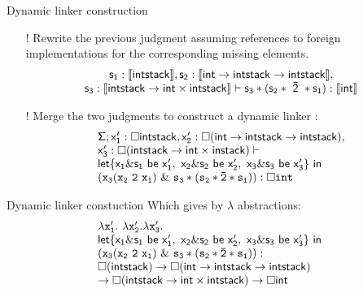 \documentclass{beamer}
\begin{document}
 \begin{frame} {Dynamic linker construction}
  \begin{itemize}
  \item[!] Rewrite the previous judgment assuming references to foreign implementations for 
  the corresponding missing elements.
\[\begin{array}{c} {\sf s_1:\llbracket intstack\rrbracket, s_2:\llbracket int\rightarrow intstack\rightarrow intstack\rrbracket},\\ {\sf s_3:\llbracket intstack\rightarrow int\times intstack \rrbracket \vdash s_3 * (s_2 * \ \bar{2}\ * s_1):\llbracket int\rrbracket} \end{array} \]
\item[!] Merge the two judgments to construct a dynamic linker :
\[\begin{array}{l} {\sf \Sigma}; {\sf {x_1^{\prime}:\Box intstack ,x_2^{\prime}:\Box(int\rightarrow intstack\rightarrow intstack)}},\\ {\sf x_3^{\prime}: \Box (intstack\rightarrow int\times instack)}\vdash \\ {\sf let\{ x_1\& s_1 {\ \sf be \ } x_1^{\prime}, \ x_2\& s_2 {\ \sf be \ } x_2^{\prime}, \ x_3\& s_3 {\ \sf be \ } x_3^{\prime} \}\ in}\ \\ \mathtt{(x_3 (x_2\ 2 \ x_1)\ \& \ s_3*(s_2* \bar{2}*s_1)):\Box int} \end{array} \]
\end{itemize}
  \end{frame}
  \begin{frame}{Dynamic linker constuction}
     Which gives by $\lambda$ abstractions:\\
  \[\begin{array}{l l} \mathtt{\lambda x_1^{\prime}.\ \lambda x_2^{\prime}. \lambda x_3^{\prime}}. \\ {\sf let\{ x_1\& s_1 {\ \sf be \ } x_1^{\prime}, \ x_2\& s_2 {\ \sf be \ } x_2^{\prime}, \ x_3\& s_3 {\ \sf be \ } x_3^{\prime} \}\ in}\ \\ \mathtt{(x_3 (x_2\ 2 \ x_1)\ \& \ s_3*(s_2* \bar{2}*s_1)):}\\ {\sf \Box(intstack)\rightarrow \Box(int\rightarrow intstack\rightarrow intstack)} \\ {\sf \rightarrow \Box (intstack\rightarrow int\times intstack) \rightarrow \Box int} \end{array} \]  
 
\end{frame} 
\end{document}
